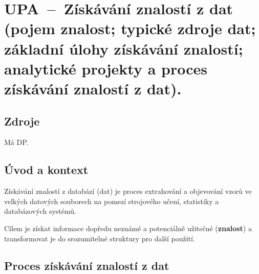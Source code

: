 

\graphicspath{{upa/ziskavani_znalosti_z_dat/figures}}


\chapter{UPA~--~Získávání znalostí z dat (pojem znalost; typické zdroje dat; základní úlohy získávání znalostí; analytické projekty a proces získávání znalostí z dat).}


\section{Zdroje}

\begin{compactitem}
    \item Má DP.
\end{compactitem}


\section{Úvod a kontext}

\begin{compactitem}
    \item Získávání znalostí z databází (dat) je proces extrahování a objevování vzorů ve velkých datových souborech na pomezí strojového učení, statistiky a databázových systémů.

    \item Cílem je získat informace dopředu neznámé a potenciálně užitečné (\textbf{znalost}) a transformovat je do srozumitelné struktury pro další použití.
\end{compactitem}


\section{Proces získávání znalostí z dat}

